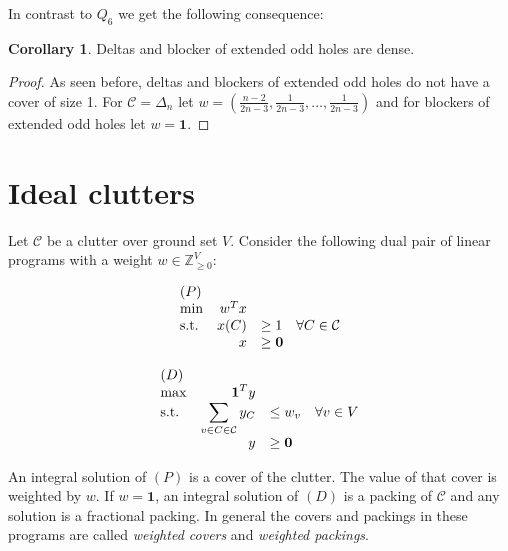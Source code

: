 \documentclass[a4paper, 12pt]{scrbook}
\theoremstyle{definition}
\newtheorem{corollary}[theorem]{Corollary}
\newcommand*{\IZ}{\ensuremath{\mathbb{Z}}}
\begin{document}
In contrast to $Q_6$ we get the following consequence:
\begin{corollary}
    Deltas and blocker of extended odd holes are dense.
\end{corollary}

\begin{proof}
    As seen before, deltas and blockers of extended odd holes do not have a cover of size 1.
    For $\mathcal{C}=\Delta_n$ let $w=\left(\frac{n-2}{2n-3}, \frac 1{2n-3}, \ldots, \frac 1{2n-3}\right)$ and for blockers of extended odd holes let $w=\textbf{1}$.
\end{proof}

\section{Ideal clutters}
Let $\mathcal{C}$ be a clutter over ground set $V$. Consider the following dual pair of linear programs with a weight $w \in \IZ^V_{\geq 0}$:
\newline
\newline
    \begin{minipage}{.5\linewidth}
        \begin{equation*}
            \begin{array}{l@{\quad} r l l}
                (P)\\
                \min          &w^Tx   \\
                \mathrm{s.t.}  &x(C) &\geq  1 \quad \forall C \in \mathcal{C} \\
                    &   x &\geq   \textbf{0}
            \end{array}
        \end{equation*}
    \end{minipage}
    \begin{minipage}{.5\linewidth}
        \begin{equation*}
            \begin{array}{l@{\quad} r l l}
                (D)\\
                \max          &\textbf{1}^Ty   \\
                \mathrm{s.t.}  &\displaystyle\sum\limits_{v \in C \in \mathcal{C}} y_C &\leq  w_v \quad \forall v \in V \\
                    &   y &\geq   \textbf{0}
            \end{array}
        \end{equation*}
    \end{minipage}
   \newline
   \newline
   An integral solution of $(P)$ is a cover of the clutter. The value of that cover is weighted by $w$. If $w=\textbf{1}$, an integral solution of $(D)$ is a packing of $\mathcal{C}$ and any solution is a fractional packing.
   In general the covers and packings in these programs are called \emph{weighted covers} and \emph{weighted packings}.
\end{document}
